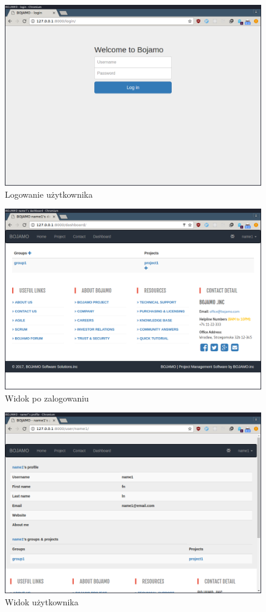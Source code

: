 \documentclass[12pt]{article}
\begin{document}
\begin{figure}[htp]
\centering
\includegraphics[scale=.5]{img/login.png}
\caption{Logowanie użytkownika}
\label{}
\end{figure}

\begin{figure}[htp]
\centering
\includegraphics[scale=.5]{img/dashboard.png}
\caption{Widok po zalogowaniu}
\label{}
\end{figure}

\begin{figure}[htp]
\centering
\includegraphics[scale=.5]{img/user.png}
\caption{Widok użytkownika}
\label{}
\end{figure}
\end{document}
